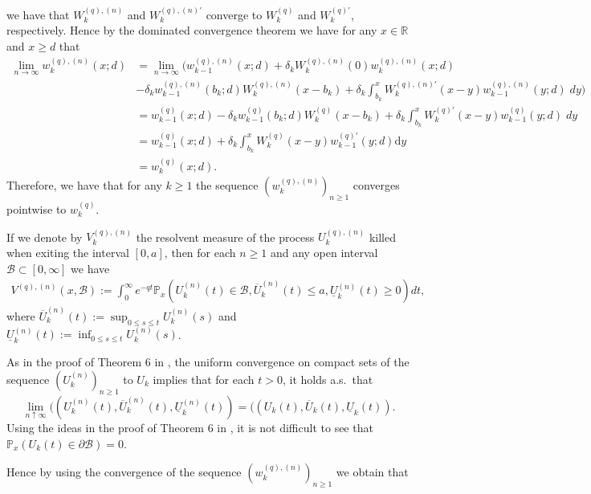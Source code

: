 \documentclass[12pt,reqno]{amsart}
\theoremstyle{definition}
\theoremstyle{remark}
\newcommand{\md}{\mathrm{d}}
\begin{document}
we have that $W^{(q),(n)}_k$ and $W^{(q),(n)\prime}_k$ converge to $W^{(q)}_k$ and $W^{(q)\prime}_k$, respectively. 
Hence by the dominated convergence theorem we have for any $x\in \mathbb{R}$ and $x\geq d$ that
\begin{align*}
\lim_{n\to\infty}w^{(q),(n)}_k(x;d)&=\lim_{n\to\infty}\Bigg(w_{k-1}^{(q),(n)}(x;d)+\delta_k W_k^{(q),(n)}(0)w^{(q),(n)}_k(x;d)\\&
-\delta_kw_{k-1}^{(q),(n)}(b_k;d)W_k^{(q),(n)}(x-b_k)
+\delta_k \int_{b_k}^xW_k^{(q),(n)\prime}(x-y)w_{k-1}^{(q),(n)}(y;d)\;dy\Bigg)\\
&=w^{(q)}_{k-1}(x;d)-\delta_kw_{k-1}^{(q)}(b_k;d)W_k^{(q)}(x-b_k)+\delta_k\int_{b_k}^xW_k^{(q)\prime}(x-y)w_{k-1}^{(q)}(y;d)\;dy\\
&= w^{(q)}_{k-1}(x;d)+\delta_{k}\int^{x}_{b_{k}}W_k^{(q)}(x-y)w_{k-1}^{(q)\prime}(y;d)\md y\\
&=w^{(q)}_{k}(x;d).
\end{align*}
Therefore, we have that for any $k\geq 1$ the sequence $(w^{(q),(n)}_k)_{n\geq 1}$ converges pointwise to $w_k^{(q)}$.
\par If we denote by $V^{(q),(n)}_k$ the resolvent measure of the process $U^{(q),(n)}_k$ killed when exiting the interval $[0,a]$, 
then for each $n\geq 1$ and any open interval $\mathcal{B}\subset [0,\infty]$ we have
\begin{align*}
V^{(q),(n)}(x,\mathcal{B}):=\int_0^{\infty}e^{-qt}\mathbb{P}_x\left(U^{(n)}_k(t)\in \mathcal{B}, \overline{U}^{(n)}_k(t)\leq a,
 \underline{U}^{(n)}_k(t)\geq 0\right)dt,
\end{align*}
where $\overline{U}^{(n)}_k(t):=\sup_{0\leq s\leq t}U^{(n)}_k(s)$ and $\underline{U}^{(n)}_k(t):=\inf_{0\leq s\leq t}U^{(n)}_k(s)$.
\par As in the proof of Theorem 6 in \cite{kyprianouloeffen2010}, the uniform convergence on compact sets of the sequence 
$(U^{(n)}_k)_{n\geq 1}$ to $U_k$ implies that for each $t>0$, it holds a.s.~that 
\[
\lim_{n\uparrow \infty}((U^{(n)}_k(t),\overline{U}^{(n)}_k(t),\underline{U}^{(n)}_k(t))=((U_k(t),\overline{U}_k(t),\underline{U}_k(t)).
\]
Using the ideas in the proof of Theorem 6 in \cite{kyprianouloeffen2010}, it is not difficult to see that  $\mathbb{P}_x(U_k(t)\in\partial \mathcal{B})=0$.
\par Hence by using the convergence of the sequence $(w^{(q),(n)}_k)_{n\geq1}$ we obtain that
\end{document}
